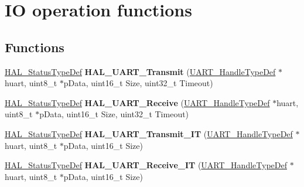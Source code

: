 \hypertarget{group___u_a_r_t___exported___functions___group2}{}\section{IO operation functions}
\label{group___u_a_r_t___exported___functions___group2}
\subsection*{Functions}
\begin{DoxyCompactItemize}
\item 
\mbox{\label{group___u_a_r_t___exported___functions___group2_ga210329848c1873957034e129ccf8944e}} 
\hyperlink{stm32f0xx__hal__def_8h_a63c0679d1cb8b8c684fbb0632743478f}{H\+A\+L\+\_\+\+Status\+Type\+Def} {\bfseries H\+A\+L\+\_\+\+U\+A\+R\+T\+\_\+\+Transmit} (\hyperlink{struct_u_a_r_t___handle_type_def}{U\+A\+R\+T\+\_\+\+Handle\+Type\+Def} $\ast$huart, uint8\+\_\+t $\ast$p\+Data, uint16\+\_\+t Size, uint32\+\_\+t Timeout)
\item 
\mbox{\label{group___u_a_r_t___exported___functions___group2_gab868edc590e3b827a14528a25c999e2f}} 
\hyperlink{stm32f0xx__hal__def_8h_a63c0679d1cb8b8c684fbb0632743478f}{H\+A\+L\+\_\+\+Status\+Type\+Def} {\bfseries H\+A\+L\+\_\+\+U\+A\+R\+T\+\_\+\+Receive} (\hyperlink{struct_u_a_r_t___handle_type_def}{U\+A\+R\+T\+\_\+\+Handle\+Type\+Def} $\ast$huart, uint8\+\_\+t $\ast$p\+Data, uint16\+\_\+t Size, uint32\+\_\+t Timeout)
\item 
\mbox{\label{group___u_a_r_t___exported___functions___group2_gaf223f2bcc2f5734f147cc5c626d757b0}} 
\hyperlink{stm32f0xx__hal__def_8h_a63c0679d1cb8b8c684fbb0632743478f}{H\+A\+L\+\_\+\+Status\+Type\+Def} {\bfseries H\+A\+L\+\_\+\+U\+A\+R\+T\+\_\+\+Transmit\+\_\+\+IT} (\hyperlink{struct_u_a_r_t___handle_type_def}{U\+A\+R\+T\+\_\+\+Handle\+Type\+Def} $\ast$huart, uint8\+\_\+t $\ast$p\+Data, uint16\+\_\+t Size)
\item 
\mbox{\label{group___u_a_r_t___exported___functions___group2_gadc0c3ef2109881d011601f0d41e70e40}} 
\hyperlink{stm32f0xx__hal__def_8h_a63c0679d1cb8b8c684fbb0632743478f}{H\+A\+L\+\_\+\+Status\+Type\+Def} {\bfseries H\+A\+L\+\_\+\+U\+A\+R\+T\+\_\+\+Receive\+\_\+\+IT} (\hyperlink{struct_u_a_r_t___handle_type_def}{U\+A\+R\+T\+\_\+\+Handle\+Type\+Def} $\ast$huart, uint8\+\_\+t $\ast$p\+Data, uint16\+\_\+t Size)

\end{DoxyCompactItemize}
